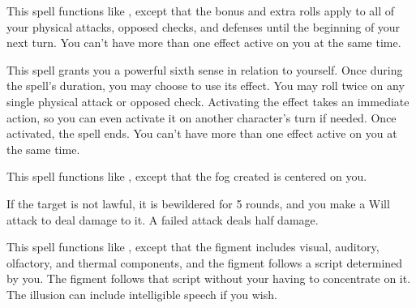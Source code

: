 \spelleffect This spell functions like , except that the bonus and extra rolls apply to all of your physical attacks, opposed checks, and defenses until the beginning of your next turn.
\spellnotes You can't have more than one  effect active on you at the same time.

\spelleffect This spell grants you a powerful sixth sense in relation to yourself. Once during the spell's duration, you may choose to use its effect. You may roll twice on any single physical attack or opposed check. Activating the effect takes an immediate action, so you can even activate it on another character's turn if needed. Once activated, the spell ends.
\spellnotes You can't have more than one  effect active on you at the same time.

\begin{comment}
\subsubsection{O-P}
\end{comment}

\spelleffect This spell functions like , except that the fog created is centered on you.

\spelleffect If the target is not lawful, it is bewildered for 5 rounds, and you make a Will attack to deal damage to it. A failed attack deals half damage.

\spelldur{\durmed \dismissable}
\spelleffect This spell functions like , except that the figment includes visual, auditory, olfactory, and thermal components, and the figment follows a script determined by you. The figment follows that script without your having to concentrate on it. The illusion can include intelligible speech if you wish.


